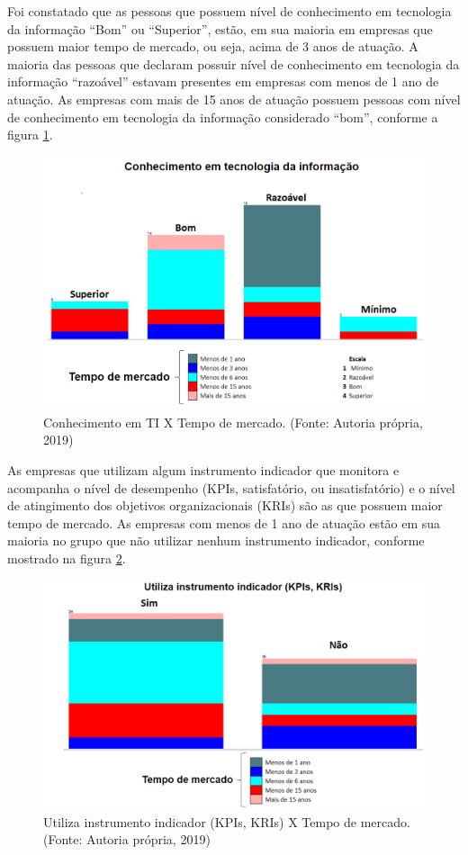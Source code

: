 Foi constatado que as pessoas que possuem nível de conhecimento em tecnologia da informação “Bom” ou “Superior”, estão, em sua maioria em empresas que possuem maior tempo de mercado, ou seja, acima de 3 anos de atuação. A maioria das pessoas que declaram possuir nível de conhecimento em tecnologia da informação “razoável” estavam presentes em empresas com menos de 1 ano de atuação. As empresas com mais de 15 anos de atuação possuem pessoas com nível de conhecimento em tecnologia da informação considerado “bom”, conforme a figura \ref{fig:grafico48}.

\begin{figure}[H]

\centering
\includegraphics[width=13cm]{./fig/grafico01}
\caption{Conhecimento em TI X Tempo de mercado. (Fonte: Autoria própria, 2019)}
\label{fig:grafico48}
\end{figure}

As empresas que utilizam algum instrumento indicador que monitora e acompanha o nível de desempenho (KPIs, satisfatório, ou insatisfatório) e o nível de atingimento dos objetivos organizacionais (KRIs) são as que possuem maior tempo de mercado. As empresas com menos de 1 ano de atuação estão em sua maioria no grupo que não utilizar nenhum instrumento indicador, conforme mostrado na figura \ref{fig:grafico49}.

\begin{figure}[H]

\centering
\includegraphics[width=13cm]{./fig/grafico05}
\caption{Utiliza instrumento indicador (KPIs, KRIs) X Tempo de mercado. (Fonte: Autoria própria, 2019)}
\label{fig:grafico49}
\end{figure}


